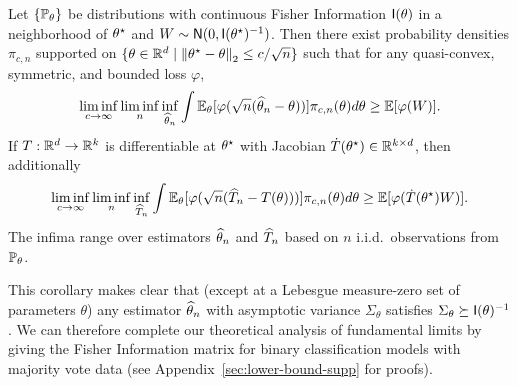 \begin{corollary}
  \label{corollary:lam}
  Let $\{\P_\theta\}$ be distributions
  with continuous Fisher Information $\fisher(\theta)$ in a neighborhood
  of $\theta\opt$ and $W \sim \normal(0, \fisher(\theta\opt)^{-1})$.
  Then there exist
  probability densities $\pi_{c,n}$ supported on
  $\{\theta \in \R^d \mid \ltwo{\theta\opt - \theta} \le c/\sqrt{n}\}$
  such that for any quasi-convex, symmetric, and bounded
  loss $\varphi$,
  \begin{equation*}
    \liminf_{c \to \infty}
    \liminf_n \inf_{\what{\theta}_n}
    \int \E_\theta[\varphi(\sqrt{n}(\what{\theta}_n - \theta))]
    \pi_{c,n}(\theta) d\theta
    \ge \E[\varphi(W)].
  \end{equation*}
  If $T : \R^d \to
  \R^k$ is differentiable at $\theta\opt$ with Jacobian $\dot{T}(\theta\opt) \in \R^{k \times d}$, then additionally
  \begin{equation*}
    \liminf_{c \to \infty}
    \liminf_n \inf_{\what{T}_n}
    \int \E_\theta[\varphi(\sqrt{n}(\what{T}_n - T(\theta)))]
    \pi_{c,n}(\theta) d\theta
    \ge \E[\varphi(\dot{T}(\theta\opt) W)].
  \end{equation*}
  The infima range over estimators $\what{\theta}_n$ and
  $\what{T}_n$ based on $n$ i.i.d.\ observations from $\P_\theta$.
\end{corollary}
\noindent
This corollary %
makes clear that (except at a Lebesgue measure-zero set of
parameters $\theta$) any estimator $\what{\theta}_n$ with asymptotic
variance $\Sigma_\theta$ satisfies
$\Sigma_\theta \succeq \fisher(\theta)^{-1}$.
%
We can therefore complete our theoretical analysis of fundamental limits by
giving the Fisher Information matrix for binary classification models with
majority vote data (see Appendix~\ref{sec:lower-bound-supp} for proofs). 

